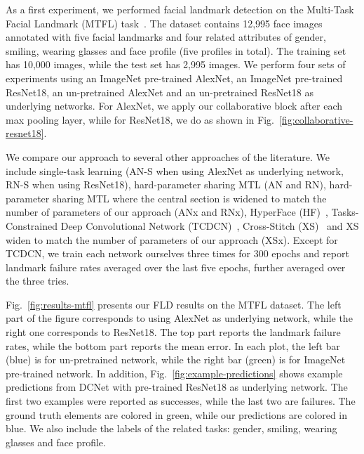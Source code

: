 \documentclass[runningheads]{llncs}
\newcommand{\citep}{\cite}
\begin{document}
As a first experiment, we performed facial landmark detection on the Multi-Task Facial Landmark (MTFL) task~\citep{zhang2014facial}. The dataset contains 12,995 face images annotated with five facial landmarks and four related attributes of gender, smiling, wearing glasses and face profile (five profiles in total). The training set has 10,000 images, while the test set has 2,995 images. We perform four sets of experiments using an ImageNet pre-trained AlexNet, an ImageNet pre-trained ResNet18, an un-pretrained AlexNet and an un-pretrained ResNet18 as underlying networks. For AlexNet, we apply our collaborative block after each max pooling layer, while for ResNet18, we do as shown in Fig.~\ref{fig:collaborative-resnet18}.

We compare our approach to several other approaches of the literature. We include single-task learning (AN-S when using AlexNet as underlying network, RN-S when using ResNet18), hard-parameter sharing MTL (AN and RN), hard-parameter sharing MTL where the central section is widened to match the number of parameters of our approach (ANx and RNx), HyperFace (HF)~\citep{ranjan2016hyperface}, Tasks-Constrained Deep Convolutional Network (TCDCN)~\citep{zhang2014facial}, Cross-Stitch (XS)~\citep{misra2016cross} and XS widen to match the number of parameters of our approach (XSx). Except for TCDCN, we train each network ourselves three times for 300 epochs and report landmark failure rates averaged over the last five epochs, further averaged over the three tries.

Fig.~\ref{fig:results-mtfl} presents our FLD results on the MTFL dataset. The left part of the figure corresponds to using AlexNet as underlying network, while the right one corresponds to ResNet18. The top part reports the landmark failure rates, while the bottom part reports the mean error. In each plot, the left bar (blue) is for un-pretrained network, while the right bar (green) is for ImageNet pre-trained network. In addition, Fig.~\ref{fig:example-predictions} shows example predictions from DCNet with pre-trained ResNet18 as underlying network. The first two examples were reported as successes, while the last two are failures. The ground truth elements are colored in green, while our predictions are colored in blue. We also include the labels of the related tasks: gender, smiling, wearing glasses and face profile.
\end{document}
